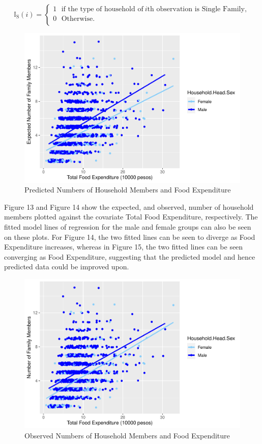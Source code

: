 \documentclass[
]{article}
\begin{document}
\[\mathbb{I}_{\mbox{S}}(i)=\left\{
\begin{array}{ll}
1 ~~~ \mbox{if the type of household of} ~ i \mbox{th observation is Single Family},\\
0 ~~~ \mbox{Otherwise}.\\
\end{array}
\right.\]

\begin{figure}[H]

{\centering \includegraphics[width=0.8\linewidth]{Group_01_files/figure-latex/pred plot-1} 

}

\caption{Predicted Numbers of Household Members and Food Expenditure}\label{fig:pred plot}
\end{figure}

Figure 13 and Figure 14 show the expected, and observed, number of
household members plotted against the covariate Total Food Expenditure,
respectively. The fitted model lines of regression for the male and
female groups can also be seen on these plots. For Figure 14, the two
fitted lines can be seen to diverge as Food Expenditure increases,
whereas in Figure 15, the two fitted lines can be seen converging as
Food Expenditure, suggesting that the predicted model and hence
predicted data could be improved upon.

\begin{figure}[H]

{\centering \includegraphics[width=0.8\linewidth]{Group_01_files/figure-latex/comp plot-1} 

}

\caption{Observed Numbers of Household Members and Food Expenditure}\label{fig:comp plot}
\end{figure}
\end{document}
